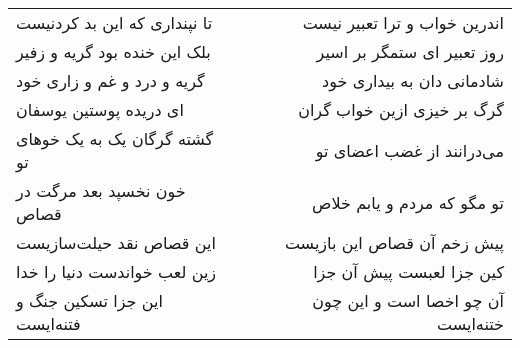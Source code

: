 \begin{center}
\begin{longtable}{l p{0.5cm} r}
تا نپنداری که این بد کردنیست
&&
اندرین خواب و ترا تعبیر نیست
\\
بلک این خنده بود گریه و زفیر
&&
روز تعبیر ای ستمگر بر اسیر
\\
گریه و درد و غم و زاری خود
&&
شادمانی دان به بیداری خود
\\
ای دریده پوستین یوسفان
&&
گرگ بر خیزی ازین خواب گران
\\
گشته گرگان یک به یک خوهای تو
&&
می‌درانند از غضب اعضای تو
\\
خون نخسپد بعد مرگت در قصاص
&&
تو مگو که مردم و یابم خلاص
\\
این قصاص نقد حیلت‌سازیست
&&
پیش زخم آن قصاص این بازیست
\\
زین لعب خواندست دنیا را خدا
&&
کین جزا لعبست پیش آن جزا
\\
این جزا تسکین جنگ و فتنه‌ایست
&&
آن چو اخصا است و این چون ختنه‌ایست
\\
\end{longtable}
\end{center}
